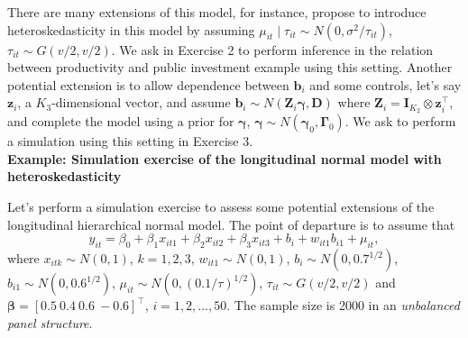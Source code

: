There are many extensions of this model, for instance, \cite{Chib1999} propose to introduce heteroskedasticity in this model by assuming $\mu_{it}\mid \tau_{it}\sim N(0, \sigma^2/\tau_{it})$, $\tau_{it}\sim G(v/2,v/2)$. We ask in Exercise 2 to perform inference in the relation between productivity and public investment example using this setting. Another potential extension is to allow dependence between $\bm{b}_i$ and some controls, let's say $\bm{z}_i$, a $K_3$-dimensional vector, and assume $\bm{b}_i\sim N(\bm{Z}_i\bm{\gamma},\bm{D})$ where $\bm{Z}_i=\bm{I}_{K_2}\otimes \bm{z}_i^{\top}$, and complete the model using a prior for $\bm{\gamma}$, $\bm{\gamma}\sim N(\bm{\gamma}_0,\bm{\Gamma}_0)$. We ask to perform a simulation using this setting in Exercise 3.\\   

\textbf{Example: Simulation exercise of the longitudinal normal model with heteroskedasticity}

Let's perform a simulation exercise to assess some potential extensions of the longitudinal hierarchical normal model. The point of departure is to assume that
\[y_{it}=\beta_0+\beta_1x_{it1}+\beta_2x_{it2}+\beta_3x_{it3}+b_i+w_{it1}b_{i1}+\mu_{it},\]
where $x_{itk}\sim N(0,1)$, $k=1,2,3$, $w_{it1}\sim N(0,1)$, $b_i\sim N(0, 0.7^{1/2})$, $b_{i1}\sim N(0, 0.6^{1/2})$, $\mu_{it}\sim N(0, (0.1/\tau)^{1/2})$, $\tau_{it}\sim G(v/2,v/2)$ and $\bm{\beta}=[0.5 \ 0.4 \ 0.6 \ -0.6]^{\top}$, $i=1,2,\dots,50$. The sample size is 2000 in an \textit{unbalanced panel structure}. 

